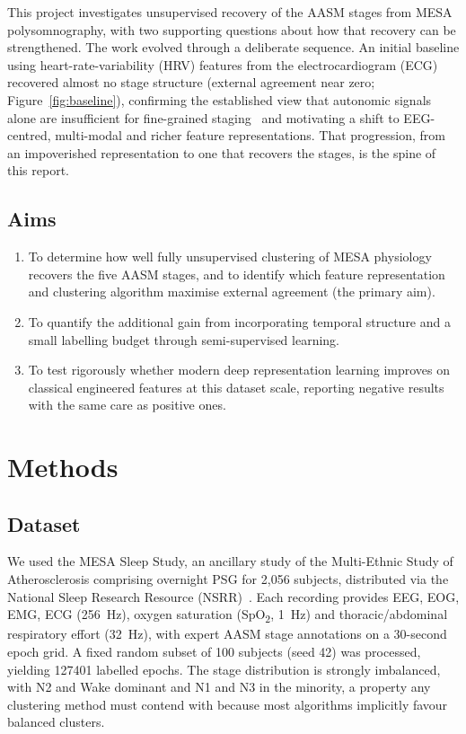 \documentclass[11pt,a4paper]{article}
\begin{document}
This project investigates unsupervised recovery of the AASM stages from MESA
polysomnography, with two supporting questions about how that recovery can be
strengthened. The work evolved through a deliberate sequence. An initial baseline
using heart-rate-variability (HRV) features from the electrocardiogram (ECG)
recovered almost no stage structure (external agreement near zero;
Figure~\ref{fig:baseline}), confirming the established view that autonomic signals
alone are insufficient for fine-grained staging~\cite{ma2026} and motivating a
shift to EEG-centred, multi-modal and richer feature representations. That
progression, from an impoverished representation to one that recovers the stages,
is the spine of this report.

\subsection{Aims}
\begin{enumerate}\itemsep0.1em
\item To determine how well fully unsupervised clustering of MESA physiology
recovers the five AASM stages, and to identify which feature representation and
clustering algorithm maximise external agreement (the primary aim).
\item To quantify the additional gain from incorporating temporal structure and a
small labelling budget through semi-supervised learning.
\item To test rigorously whether modern deep representation learning improves on
classical engineered features at this dataset scale, reporting negative results
with the same care as positive ones.
\end{enumerate}

\section{Methods}
\subsection{Dataset}
We used the MESA Sleep Study, an ancillary study of the Multi-Ethnic Study of
Atherosclerosis comprising overnight PSG for 2{,}056 subjects, distributed via the
National Sleep Research Resource (NSRR)~\cite{zhang2018,chen2015}. Each recording
provides EEG, EOG, EMG, ECG (\SI{256}{\hertz}), oxygen saturation
(SpO\textsubscript{2}, \SI{1}{\hertz}) and thoracic/abdominal respiratory effort
(\SI{32}{\hertz}), with expert AASM stage annotations on a 30-second epoch grid. A
fixed random subset of 100 subjects (seed 42) was processed, yielding \num{127401}
labelled epochs. The stage distribution is strongly imbalanced, with N2 and Wake
dominant and N1 and N3 in the minority, a property any clustering method must
contend with because most algorithms implicitly favour balanced clusters.
\end{document}
